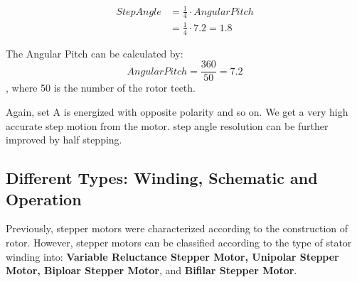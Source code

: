 \documentclass[journal]{IEEEtran}
\begin{document}
\begin{equation} \label{eq1}
\begin{split}
Step Angle & =  \frac{1}{4} \cdot Angular Pitch \\
 & = \frac{1}{4} \cdot 7.2 = 1.8
\end{split}
\end{equation}

The Angular Pitch can be calculated by: 
\begin{equation}
    Angular Pitch = \frac{360}{50} = 7.2
\end{equation}
, where 50 is the number of the rotor teeth.


Again, set A is energized with opposite polarity and so on. We get a very high accurate step motion from the motor. step angle resolution can be further improved by half stepping. 



\subsection{Different Types: Winding, Schematic and Operation}
Previously, stepper motors were characterized according to the construction of rotor. However, stepper motors can be classified according to the type of stator winding into: \textbf{Variable Reluctance Stepper Motor, Unipolar Stepper Motor, Biploar Stepper Motor}, and \textbf{Bifilar Stepper Motor}. \cite{stepTypes_stepper}\\
\end{document}
